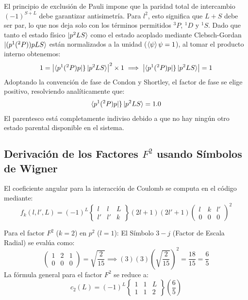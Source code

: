 \documentclass[11pt,a4paper]{article}
\begin{document}
El principio de exclusión de Pauli impone que la paridad total de intercambio $(-1)^{S+L}$ debe garantizar antisimetría. Para $l^2$, esto significa que $L+S$ debe ser par, lo que nos deja solo con los términos permitidos $^3P$, $^1D$ y $^1S$.
Dado que tanto el estado físico $\ket{p^2 L S}$ como el estado acoplado mediante Clebsch-Gordan $\ket{(p^1(^2P)) p L S}$ están normalizados a la unidad ($\braket{\psi}{\psi} = 1$), al tomar el producto interno obtenemos:
\begin{equation}
1 = \left| \bra{p^1(^2P) p} \}\ket{p^2 L S} \right|^2 \times 1 \implies \left| \bra{p^1(^2P) p} \}\ket{p^2 L S} \right| = 1
\end{equation}
Adoptando la convención de fase de Condon y Shortley, el factor de fase se elige positivo, resolviendo analíticamente que:
\begin{equation}
\bra{p^1(^2P) p} \}\ket{p^2 L S} = 1.0
\end{equation}
El parentesco está completamente indiviso debido a que no hay ningún otro estado parental disponible en el sistema.

\subsection{Derivación de los Factores $F^2$ usando Símbolos de Wigner}
El coeficiente angular para la interacción de Coulomb se computa en el código mediante:
\begin{equation}
f_k(l, l', L) = (-1)^L \begin{Bmatrix} l & l & L \\ l' & l' & k \end{Bmatrix} (2l+1)(2l'+1) \begin{pmatrix} l & k & l' \\ 0 & 0 & 0 \end{pmatrix}^2 
\end{equation}

Para el factor $F^2$ ($k=2$) en $p^2$ ($l=1$):
El Símbolo $3-j$ (Factor de Escala Radial) se evalúa como:
\begin{equation}
\begin{pmatrix} 1 & 2 & 1 \\ 0 & 0 & 0 \end{pmatrix} = \sqrt{\frac{2}{15}} \implies (3)(3) \left(\sqrt{\frac{2}{15}}\right)^2 = \frac{18}{15} = \frac{6}{5}
\end{equation}
La fórmula general para el factor $F^2$ se reduce a:
\begin{equation}
c_2(L) = (-1)^L \begin{Bmatrix} 1 & 1 & L \\ 1 & 1 & 2 \end{Bmatrix} \left( \frac{6}{5} \right)
\end{equation}
\end{document}
